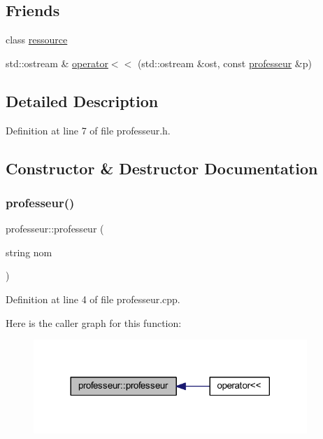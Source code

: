 \subsection*{Friends}
\begin{DoxyCompactItemize}
\item 
class \hyperlink{classprofesseur_a24d55629351652ce27831ce9ef5194c9}{ressource}
\item 
std\+::ostream \& \hyperlink{classprofesseur_af2c9e0cbc90dfc33c6edca8c14d7f1bd}{operator$<$$<$} (std\+::ostream \&ost, const \hyperlink{classprofesseur}{professeur} \&p)
\end{DoxyCompactItemize}


\subsection{Detailed Description}


Definition at line 7 of file professeur.\+h.



\subsection{Constructor \& Destructor Documentation}
\hypertarget{classprofesseur_a3cc95d3ac471e633c318782228a8682e}{}\label{classprofesseur_a3cc95d3ac471e633c318782228a8682e} 
\subsubsection{\texorpdfstring{professeur()}{professeur()}\hspace{0.1cm}{\footnotesize\ttfamily [1/2]}}
{\footnotesize\ttfamily professeur\+::professeur (\begin{DoxyParamCaption}\item[{string}]{nom }\end{DoxyParamCaption})}



Definition at line 4 of file professeur.\+cpp.

Here is the caller graph for this function\+:\nopagebreak
\begin{figure}[H]
\begin{center}
\leavevmode
\includegraphics[width=293pt]{classprofesseur_a3cc95d3ac471e633c318782228a8682e_icgraph}
\end{center}
\end{figure}
\hypertarget{classprofesseur_a652526233e701be639ecb40a73161039}{}\label{classprofesseur_a652526233e701be639ecb40a73161039} 

